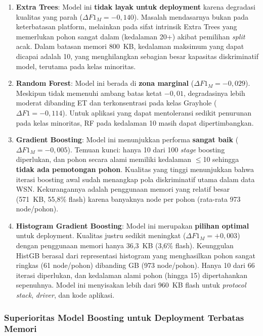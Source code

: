 \begin{enumerate}
    \item \textbf{Extra Trees}: Model ini \textbf{tidak layak untuk deployment} karena degradasi kualitas yang parah ($\Delta F1_M = -0{,}140$). Masalah mendasarnya bukan pada keterbatasan platform, melainkan pada sifat intrinsik Extra Trees yang memerlukan pohon sangat dalam (kedalaman 20+) akibat pemilihan \textit{split} acak. Dalam batasan memori 800~KB, kedalaman maksimum yang dapat dicapai adalah 10, yang menghilangkan sebagian besar kapasitas diskriminatif model, terutama pada kelas minoritas.

    \item \textbf{Random Forest}: Model ini berada di \textbf{zona marginal} ($\Delta F1_M = -0{,}029$). Meskipun tidak memenuhi ambang batas ketat $-0{,}01$, degradasinya lebih moderat dibanding ET dan terkonsentrasi pada kelas Grayhole ($\Delta F1 = -0{,}114$). Untuk aplikasi yang dapat mentoleransi sedikit penurunan pada kelas minoritas, RF pada kedalaman 10 masih dapat dipertimbangkan.

    \item \textbf{Gradient Boosting}: Model ini menunjukkan performa \textbf{sangat baik} ($\Delta F1_M = -0{,}005$). Temuan kunci: hanya 10 dari 100 \textit{stage} boosting diperlukan, dan pohon secara alami memiliki kedalaman $\leq$10 sehingga \textbf{tidak ada pemotongan pohon}. Kualitas yang tinggi menunjukkan bahwa iterasi boosting awal sudah menangkap pola diskriminatif utama dalam data WSN. Kekurangannya adalah penggunaan memori yang relatif besar (571~KB, 55,8\% flash) karena banyaknya node per pohon (rata-rata 973 node/pohon).

    \item \textbf{Histogram Gradient Boosting}: Model ini merupakan \textbf{pilihan optimal} untuk deployment. Kualitas justru sedikit meningkat ($\Delta F1_M = +0{,}003$) dengan penggunaan memori hanya 36,3~KB (3,6\% flash). Keunggulan HistGB berasal dari representasi histogram yang menghasilkan pohon sangat ringkas (61 node/pohon) dibanding GB (973 node/pohon). Hanya 10 dari 66 iterasi diperlukan, dan kedalaman alami pohon (hingga 15) dipertahankan sepenuhnya. Model ini menyisakan lebih dari 960~KB flash untuk \textit{protocol stack}, \textit{driver}, dan kode aplikasi.
\end{enumerate}

\subsubsection{Superioritas Model Boosting untuk Deployment Terbatas Memori}

